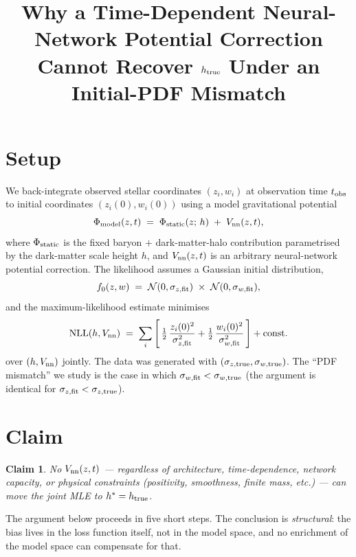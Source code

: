 \documentclass[11pt]{article}
\title{Why a Time-Dependent Neural-Network Potential Correction\\
Cannot Recover $h_{\rm true}$ Under an Initial-PDF Mismatch}
\author{}
\date{}
\newtheorem*{claim}{Claim}
\begin{document}
\maketitle

\section*{Setup}

We back-integrate observed stellar coordinates $(z_i, w_i)$ at observation
time $t_{\rm obs}$ to initial coordinates $(z_i(0), w_i(0))$ using a model
gravitational potential
\begin{equation}
  \Phi_{\rm model}(z, t) \;=\; \Phi_{\rm static}(z;\,h) \;+\; V_{\rm nn}(z, t),
\end{equation}
where $\Phi_{\rm static}$ is the fixed baryon $+$ dark-matter-halo contribution
parametrised by the dark-matter scale height $h$, and $V_{\rm nn}(z, t)$ is an
arbitrary neural-network potential correction.  The likelihood assumes a
Gaussian initial distribution,
\begin{equation}
  f_0(z, w) \;=\; \mathcal{N}(0, \sigma_{z,\rm fit})\;\times\;\mathcal{N}(0, \sigma_{w,\rm fit}),
\end{equation}
and the maximum-likelihood estimate minimises
\begin{equation}
  \mathrm{NLL}(h, V_{\rm nn}) \;=\; \sum_i \left[\,\tfrac{1}{2}\,\frac{z_i(0)^2}{\sigma_{z,\rm fit}^2} + \tfrac{1}{2}\,\frac{w_i(0)^2}{\sigma_{w,\rm fit}^2}\,\right] + \mathrm{const}.
\label{eq:nll}
\end{equation}
over $(h, V_{\rm nn})$ jointly.  The data was generated with
$(\sigma_{z,\rm true}, \sigma_{w,\rm true})$.  The ``PDF mismatch'' we study is
the case in which $\sigma_{w,\rm fit} < \sigma_{w,\rm true}$ (the argument is
identical for $\sigma_{z,\rm fit} < \sigma_{z,\rm true}$).

\section*{Claim}

\begin{claim}
No $V_{\rm nn}(z, t)$ --- regardless of architecture, time-dependence, network
capacity, or physical constraints (positivity, smoothness, finite mass, etc.)
--- can move the joint MLE to $h^* = h_{\rm true}$.
\end{claim}

The argument below proceeds in five short steps.  The conclusion is
\emph{structural}: the bias lives in the loss function itself, not in the model
space, and no enrichment of the model space can compensate for that.
\end{document}
